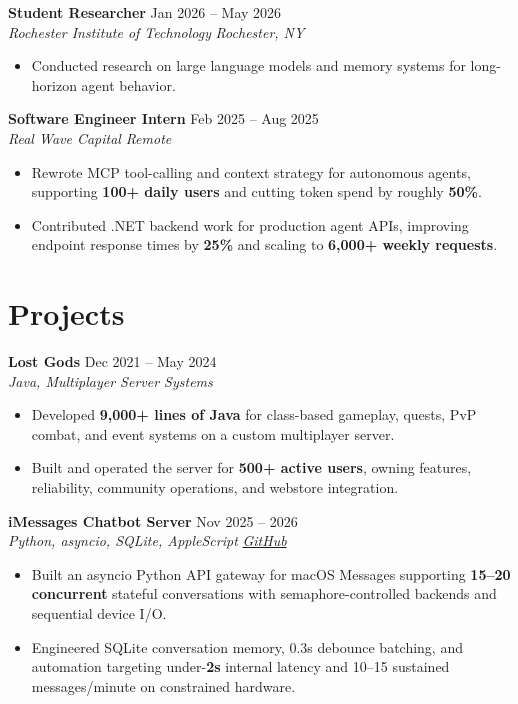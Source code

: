 \documentclass[10pt,letterpaper]{article}
\newif\ifresumeFirstRole
\newcommand{\resumeRole}[4]{%
  \ifresumeFirstRole
    \global\resumeFirstRolefalse
  \else
    \vspace{0pt plus 1fill}%
  \fi
  \textbf{#1} \hfill #2\\
  \textit{#3} \hfill \textit{#4}
}
\begin{document}
\resumeRole{Student Researcher}{Jan 2026 -- May 2026}{Rochester Institute of Technology}{Rochester, NY}
\begin{itemize}
  \item Conducted research on large language models and memory systems for long-horizon agent behavior.
\end{itemize}

\resumeRole{Software Engineer Intern}{Feb 2025 -- Aug 2025}{Real Wave Capital}{Remote}
\begin{itemize}
  \item Rewrote MCP tool-calling and context strategy for autonomous agents, supporting \textbf{100+ daily users} and cutting token spend by roughly \textbf{50\%}.
  \item Contributed .NET backend work for production agent APIs, improving endpoint response times by \textbf{25\%} and scaling to \textbf{6,000+ weekly requests}.
\end{itemize}

\section*{Projects}
\resumeRole{Lost Gods}{Dec 2021 -- May 2024}{Java, Multiplayer Server Systems}{}
\begin{itemize}
  \item Developed \textbf{9,000+ lines of Java} for class-based gameplay, quests, PvP combat, and event systems on a custom multiplayer server.
  \item Built and operated the server for \textbf{500+ active users}, owning features, reliability, community operations, and webstore integration.
\end{itemize}

\resumeRole{iMessages Chatbot Server}{Nov 2025 -- 2026}{Python, asyncio, SQLite, AppleScript}{\href{https://github.com/alextyhwang/iMessages-Chatbot-Server}{GitHub}}
\begin{itemize}
  \item Built an asyncio Python API gateway for macOS Messages supporting \textbf{15--20 concurrent} stateful conversations with semaphore-controlled backends and sequential device I/O.
  \item Engineered SQLite conversation memory, 0.3s debounce batching, and automation targeting under-\textbf{2s} internal latency and 10--15 sustained messages/minute on constrained hardware.
\end{itemize}
\end{document}
